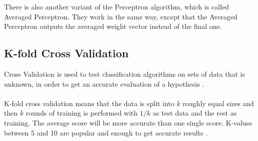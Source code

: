 There is also another variant of the Perceptron algorithm, which is called Averaged Perceptron. They work in the same way, except that the Averaged Perceptron outputs the averaged weight vector instead of the final one.

\subsection{K-fold Cross Validation}
Cross Validation is used to test classification algorithms on sets of data that is unknown, in order to get an accurate evaluation of a hypothesis \citep{crossvalid_ai}.\\\\
K-fold cross validation means that the data is split into $k$ roughly equal sizes and then $k$ rounds of training is performed with $1/k$ as test data and the rest as training. The average score will be more accurate than one single score. K-values between 5 and 10 are popular and enough to get accurate results \citep{crossvalid_ai}.

